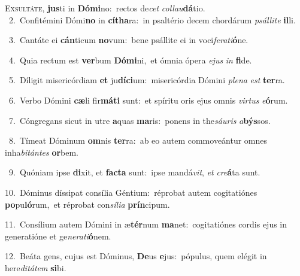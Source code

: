 \lettrine{\initial\textcolor{\initialcolor}{E}}{xsultáte,} \textbf{jus}\-ti in \textbf{Dó}\-\textbf{mi}no:~\star rectos de\textit{cet} \textit{col}\-\textit{lau}\textbf{dá}tio.\\
{\numbfont\textcolor{\numbcolor}{~2.}}~Confitémini Dómi\textbf{no} in \textbf{cí}\-\textbf{tha}ra:~\star in psaltério decem chordárum \textit{psál}\-\textit{li}\textit{te} \textbf{il}\-li.\par
{\numbfont\textcolor{\numbcolor}{~3.}}~Cantáte ei \textbf{cán}\-ticum \textbf{no}\-vum:~\star bene psállite ei in voci\-\textit{fe}\-\textit{ra}\textit{ti}\textbf{ó}ne.\par
{\numbfont\textcolor{\numbcolor}{~4.}}~Quia rectum est \textbf{ver}\-bum \textbf{Dó}\-\textbf{mi}ni,~\star et ómnia ópera \textit{e}\-\textit{jus} \textit{in} \textbf{fi}\-de.\par
{\numbfont\textcolor{\numbcolor}{~5.}}~Díligit misericórdiam \textbf{et} ju\-\textbf{dí}\-\textbf{ci}um:~\star misericórdia Dómini \textit{ple}\-\textit{na} \textit{est} \textbf{ter}\-ra.\par
{\numbfont\textcolor{\numbcolor}{~6.}}~Verbo Dómini \textbf{cæ}\-li fir\-\textbf{má}\-\textbf{ti} sunt:~\star et spíritu oris ejus omnis \textit{vir}\-\textit{tus} \textit{e}\-\textbf{ó}rum.\par
{\numbfont\textcolor{\numbcolor}{~7.}}~Cóngregans sicut in utre \textbf{a}\-quas \textbf{ma}\-ris:~\star ponens in the\-\textit{sáu}\-\textit{ris} \textit{a}\-\textbf{býs}sos.\par
{\numbfont\textcolor{\numbcolor}{~8.}}~Tímeat Dóminum \textbf{om}\-nis \textbf{ter}\-ra:~\star ab eo autem commoveántur omnes inha\-\textit{bi}\-\textit{tán}\textit{tes} \textbf{or}\-bem.\par
{\numbfont\textcolor{\numbcolor}{~9.}}~Quóniam ipse \textbf{di}\-xit, et \textbf{fac}\-\textbf{ta} sunt:~\star ipse mandá\-\textit{vit}\-, \textit{et} \textit{cre}\-\textbf{á}ta sunt.\par
{\numbfont\textcolor{\numbcolor}{10.}}~Dóminus díssipat consília Géntium:~\dagger réprobat autem cogitatiónes \textbf{po}\-pu\-\textbf{ló}\-rum,~\star et réprobat con\-\textit{sí}\-\textit{li}\textit{a} \textbf{prín}\-cipum.\par
{\numbfont\textcolor{\numbcolor}{11.}}~Consílium autem Dómini in æ\-\textbf{tér}\-num \textbf{ma}\-net:~\star cogitatiónes cordis ejus in generatióne et ge\-\textit{ne}\-\textit{ra}\textit{ti}\textbf{ó}nem.\par
{\numbfont\textcolor{\numbcolor}{12.}}~Beáta gens, cujus est Dóminus, \textbf{De}\-us \textbf{e}\-jus:~\star pópulus, quem elégit in here\-\textit{di}\-\textit{tá}\textit{tem} \textbf{si}\-bi.\par
